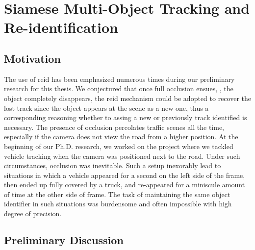 \section{Siamese Multi-Object Tracking and Re-identification}
\label{sec:SiamMOTandReID}

\subsection{Motivation}

The use of \gls{reid} has been emphasized numerous times during our preliminary research for this thesis. We conjectured that once full occlusion ensues, \ietext{}, the object completely disappears, the \gls{reid} mechanism could be adopted to recover the lost track since the object appears at the scene as a new one, thus a corresponding reasoning whether to assing a new or previously track identified is necessary. The presence of occlusion percolates traffic scenes all the time, especially if the camera does not view the road from a higher position. At the beginning of our Ph.D. research, we worked on the \interreg{} project where we tackled vehicle tracking when the camera was positioned next to the road. Under such circumstances, occlusion was inevitable. Such a setup inexorably lead to situations in which a vehicle appeared for a second on the left side of the frame, then ended up fully covered by a truck, and re-appeared for a miniscule amount of time at the other side of frame. The task of maintaining the same object identifier in such situations was burdensome and often impossible with high degree of precision.

\subsection{Preliminary Discussion}

